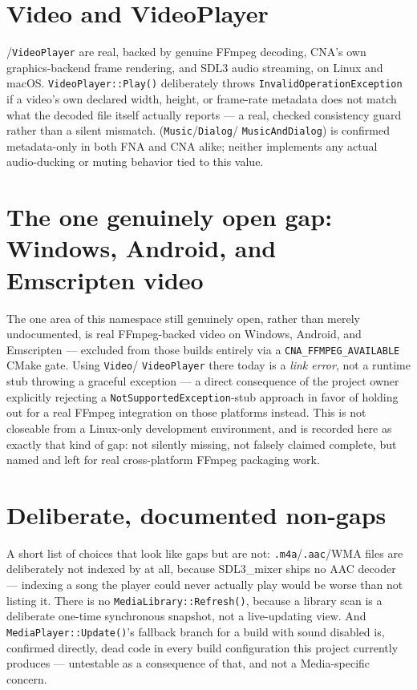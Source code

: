 \section{Video and VideoPlayer}

/\texttt{VideoPlayer} are real, backed by genuine FFmpeg decoding, CNA's own
graphics-backend frame rendering, and SDL3 audio streaming, on Linux and macOS.
\texttt{VideoPlayer::Play()} deliberately throws \texttt{InvalidOperationException} if a
video's own declared width, height, or frame-rate metadata does not match what the decoded
file itself actually reports --- a real, checked consistency guard rather than a silent
mismatch.  (\texttt{Music}/\texttt{Dialog}/%
\texttt{MusicAndDialog}) is confirmed metadata-only in both FNA and CNA alike; neither
implements any actual audio-ducking or muting behavior tied to this value.

\section{The one genuinely open gap: Windows, Android, and Emscripten video}

The one area of this namespace still genuinely open, rather than merely undocumented, is
real FFmpeg-backed video on Windows, Android, and Emscripten --- excluded from those builds
entirely via a \texttt{CNA\_FFMPEG\_AVAILABLE} CMake gate. Using \texttt{Video}/%
\texttt{VideoPlayer} there today is a \emph{link error}, not a runtime stub throwing a
graceful exception --- a direct consequence of the project owner explicitly rejecting a
\texttt{NotSupportedException}-stub approach in favor of holding out for a real FFmpeg
integration on those platforms instead. This is not closeable from a Linux-only development
environment, and is recorded here as exactly that kind of gap: not silently missing, not
falsely claimed complete, but named and left for real cross-platform FFmpeg packaging work.

\section{Deliberate, documented non-gaps}

A short list of choices that look like gaps but are not: \texttt{.m4a}/\texttt{.aac}/WMA
files are deliberately not indexed by  at all, because SDL3\_mixer
ships no AAC decoder --- indexing a song the player could never actually play would be worse
than not listing it. There is no \texttt{MediaLibrary::Refresh()}, because a library scan is
a deliberate one-time synchronous snapshot, not a live-updating view. And
\texttt{MediaPlayer::Update()}'s fallback branch for a build with sound disabled is,
confirmed directly, dead code in every build configuration this project currently produces
--- untestable as a consequence of that, and not a Media-specific concern.
